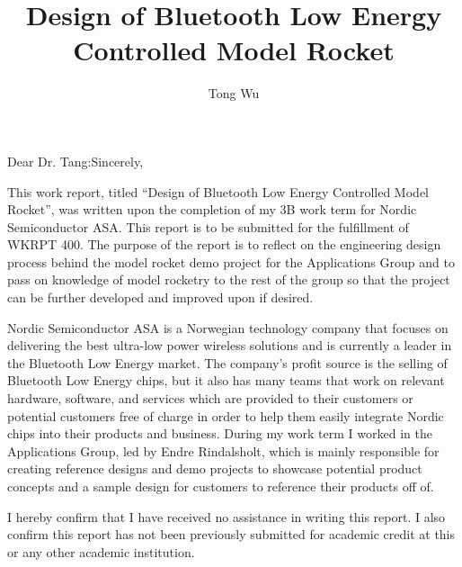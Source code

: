 \documentclass{workreport}
\title{
	Design of Bluetooth Low Energy Controlled Model Rocket
}
\author{Tong Wu}
\begin{document}

\begin{frontmatter}

\begin{letter_of_submittal}{Dear Dr. Tang:}{Sincerely,}

	This work report, titled “Design of Bluetooth Low Energy Controlled Model Rocket”, was written upon the completion of my 3B work term for Nordic Semiconductor ASA. This report is to be submitted for the fulfillment of WKRPT 400. The purpose of the report is to reflect on the engineering design process behind the model rocket demo project for the Applications Group and to pass on knowledge of model rocketry to the rest of the group so that the project can be further developed and improved upon if desired.

	Nordic Semiconductor ASA is a Norwegian technology company that focuses on delivering the best ultra-low power wireless solutions and is currently a leader in the Bluetooth Low Energy market. The company's profit source is the selling of Bluetooth Low Energy chips, but it also has many teams that work on relevant hardware, software, and services which are provided to their customers or potential customers free of charge in order to help them easily integrate Nordic chips into their products and business. During my work term I worked in the Applications Group, led by Endre Rindalsholt, which is mainly responsible for creating reference designs and demo projects to showcase potential product concepts and a sample design for customers to reference their products off of.

	I hereby confirm that I have received no assistance in writing this report. I also confirm this report has not been previously submitted for academic credit at this or any other academic institution.


\end{letter_of_submittal}

\begin{contributions}


\end{contributions}
\end{frontmatter}
\end{document}
